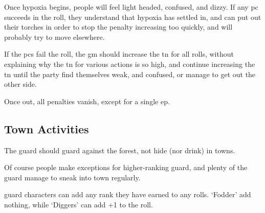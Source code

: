 \begin{multicols}{2}
Once hypoxia begins, people will feel light headed, confused, and dizzy.
If any \gls{pc} succeeds in the roll, they understand that hypoxia has settled in, and can put out their torches in order to stop the penalty increasing too quickly, and will probably try to move elsewhere.

If the \glspl{pc} fail the roll, the \gls{gm} should increase the \gls{tn} for all rolls, without explaining why the \gls{tn} for various actions is so high, and continue increasing the \gls{tn} until the party find themselves weak, and confused, or manage to get out the other side.

Once out, all penalties vanish, except for a single \gls{ep}.

\subsection{Town Activities}

The \gls{guard} should guard against the forest, not hide (nor drink) in towns.

Of course people make exceptions for higher-ranking \gls{guard}, and plenty of the guard manage to sneak into town regularly.

\Gls{guard} characters can add any rank they have earned to any rolls.
`Fodder' add nothing, while `Diggers' can add +1 to the roll.



\end{multicols}
